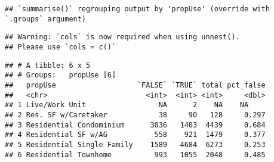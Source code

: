 \documentclass[]{article}
\newenvironment{Shaded}{\begin{snugshade}}{\end{snugshade}}
\newcommand{\DataTypeTok}[1]{\textcolor[rgb]{0.13,0.29,0.53}{#1}}
\newcommand{\DecValTok}[1]{\textcolor[rgb]{0.00,0.00,0.81}{#1}}
\newcommand{\KeywordTok}[1]{\textcolor[rgb]{0.13,0.29,0.53}{\textbf{#1}}}
\newcommand{\NormalTok}[1]{#1}
\newcommand{\OperatorTok}[1]{\textcolor[rgb]{0.81,0.36,0.00}{\textbf{#1}}}
\newcommand{\StringTok}[1]{\textcolor[rgb]{0.31,0.60,0.02}{#1}}
\begin{document}
\begin{Shaded}
\end{Shaded}

\begin{verbatim}
## `summarise()` regrouping output by 'propUse' (override with `.groups` argument)
\end{verbatim}

\begin{verbatim}
## Warning: `cols` is now required when using unnest().
## Please use `cols = c()`
\end{verbatim}

\begin{verbatim}
## # A tibble: 6 x 5
## # Groups:   propUse [6]
##   propUse                   `FALSE` `TRUE` total pct_false
##   <chr>                       <int>  <int> <int>     <dbl>
## 1 Live/Work Unit                 NA      2    NA    NA    
## 2 Res. SF w/Caretaker            38     90   128     0.297
## 3 Residential Condominium      3036   1403  4439     0.684
## 4 Residential SF w/AG           558    921  1479     0.377
## 5 Residential Single Family    1589   4684  6273     0.253
## 6 Residential Townhome          993   1055  2048     0.485
\end{verbatim}

\begin{Shaded}
\end{Shaded}
\end{document}

